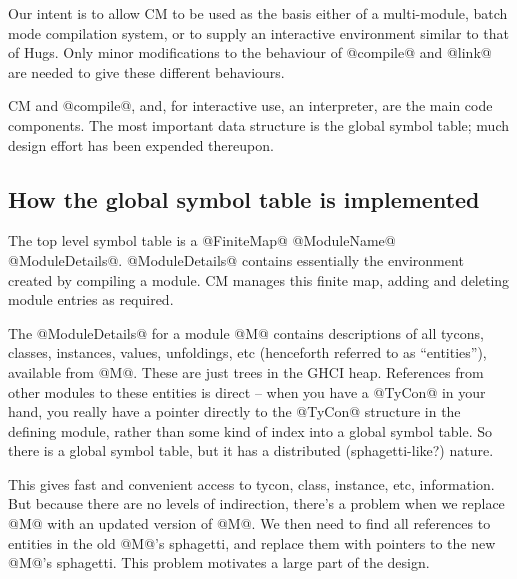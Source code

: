 \documentclass[11pt]{article}
\begin{document}
Our intent is to allow CM to be used as the basis either of a 
multi-module, batch mode compilation system, or to supply an
interactive environment similar to that of Hugs.
Only minor modifications to the behaviour of @compile@ and @link@ 
are needed to give these different behaviours.

CM and @compile@, and, for interactive use, an interpreter, are the
main code components.  The most important data structure is the global
symbol table; much design effort has been expended thereupon.


\subsection{How the global symbol table is implemented}

The top level symbol table is a @FiniteMap@ @ModuleName@
@ModuleDetails@.  @ModuleDetails@ contains essentially the environment
created by compiling a module.  CM manages this finite map, adding and
deleting module entries as required.

The @ModuleDetails@ for a module @M@ contains descriptions of all
tycons, classes, instances, values, unfoldings, etc (henceforth
referred to as ``entities''), available from @M@.  These are just
trees in the GHCI heap.  References from other modules to these
entities is direct -- when you have a @TyCon@ in your hand, you really
have a pointer directly to the @TyCon@ structure in the defining module,
rather than some kind of index into a global symbol table.  So there
is a global symbol table, but it has a distributed (sphagetti-like?)
nature.

This gives fast and convenient access to tycon, class, instance,
etc, information.  But because there are no levels of indirection,
there's a problem when we replace @M@ with an updated version of @M@.
We then need to find all references to entities in the old @M@'s
sphagetti, and replace them with pointers to the new @M@'s sphagetti.
This problem motivates a large part of the design.
\end{document}
